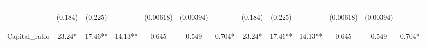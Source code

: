 \documentclass[]{article}
\begin{document}
\begin{center}
\begin{tabular}{lcccccccccccc}
\vspace{4pt} & \begin{footnotesize}(0.184)\end{footnotesize} & \begin{footnotesize}(0.225)\end{footnotesize} & \begin{footnotesize}\end{footnotesize} & \begin{footnotesize}(0.00618)\end{footnotesize} & \begin{footnotesize}(0.00394)\end{footnotesize} & \begin{footnotesize}\end{footnotesize} & \begin{footnotesize}(0.184)\end{footnotesize} & \begin{footnotesize}(0.225)\end{footnotesize} & \begin{footnotesize}\end{footnotesize} & \begin{footnotesize}(0.00618)\end{footnotesize} & \begin{footnotesize}(0.00394)\end{footnotesize} & \begin{footnotesize}\end{footnotesize} \\
Capital\_ratio & 23.24* & 17.46** & 14.13** & 0.645 & 0.549 & 0.704* & 23.24* & 17.46** & 14.13** & 0.645 & 0.549 & 0.704* \\

\end{tabular}
\end{center}
\end{document}
